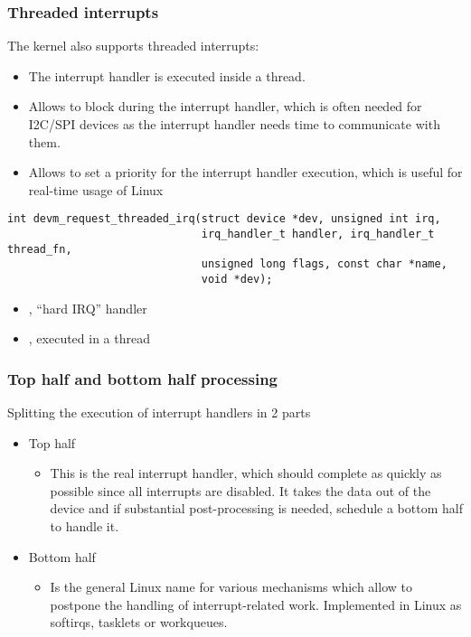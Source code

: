 \begin{frame}[fragile]
  \frametitle{Threaded interrupts}
  The kernel also supports threaded interrupts:
  \begin{itemize}
  \item The interrupt handler is executed inside a thread.
  \item Allows to block during the interrupt handler, which is often
        needed for I2C/SPI devices as the interrupt handler needs time
	to communicate with them.
  \item Allows to set a priority for the interrupt handler
        execution, which is useful for real-time usage of Linux
  \end{itemize}
  \begin{verbatim}
int devm_request_threaded_irq(struct device *dev, unsigned int irq,
                              irq_handler_t handler, irq_handler_t thread_fn,
                              unsigned long flags, const char *name,
                              void *dev);
  \end{verbatim}
  \begin{itemize}
  \item {}, ``hard IRQ'' handler
  \item {}, executed in a thread
  \end{itemize}
\end{frame}

\begin{frame}
  \frametitle{Top half and bottom half processing}
  Splitting the execution of interrupt handlers in 2 parts
  \begin{itemize}
  \item Top half
    \begin{itemize}
    \item This is the real interrupt handler, which should complete
      as quickly as possible since all interrupts are disabled.
      It takes the data out of the device and if substantial
      post-processing is needed, schedule a bottom half to handle it.
    \end{itemize}
  \item Bottom half
    \begin{itemize}
    \item Is the general Linux name for various mechanisms which
      allow to postpone the handling of interrupt-related
      work. Implemented in Linux as softirqs, tasklets or
      workqueues.
    \end{itemize}
  \end{itemize}
\end{frame}

